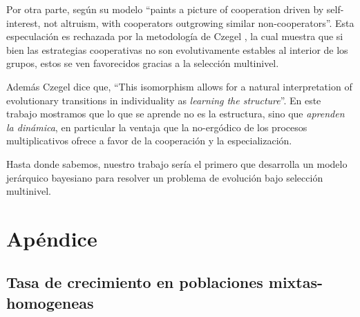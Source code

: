 \documentclass[a4paper,10pt]{article}
\begin{document}
{Por otra parte, según \cite{peters-cooperation2019.03.04} su modelo ``paints a picture of cooperation driven by self-interest, not altruism, with cooperators outgrowing similar non-cooperators''.
Esta especulación es rechazada por la metodología de Czegel \cite{czegel2019-bayesianEvolution}, la cual muestra que si bien las estrategias cooperativas no son evolutivamente estables al interior de los grupos, estos se ven favorecidos gracias a la selección multinivel.

Además Czegel \cite{czegel2019-bayesianEvolution} dice que, ``This isomorphism allows for a natural interpretation of evolutionary transitions in individuality as \emph{learning the structure}''.
En este trabajo mostramos que lo que se aprende no es la estructura, sino que \emph{aprenden la dinámica}, en particular la ventaja que la no-ergódico de los procesos multiplicativos ofrece a favor de la cooperación y la especialización.


Hasta donde sabemos, nuestro trabajo sería el primero que desarrolla un modelo jerárquico bayesiano para resolver un problema de evolución bajo selección multinivel.



{\footnotesize


}

\section{Apéndice}

\subsection{Tasa de crecimiento en poblaciones mixtas-homogeneas}

}
\end{document}
